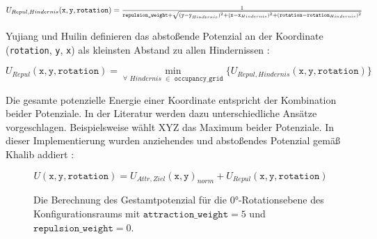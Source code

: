 \begin{equation*}
\hspace*{-0.04\linewidth}
\resizebox{1.1\linewidth}{!}{
  $ U_{Repul, Hindernis}(\texttt{x}, \texttt{y}, \texttt{rotation}) = \frac{1}{\texttt{repulsion\_weight} + \sqrt{(\texttt{y} - \texttt{y}_{Hindernis})^2 + (\texttt{x} - \texttt{x}_{Hindernis})^2 + (\texttt{rotation} - \texttt{rotation}_{Hindernis})^2}}
$ 
}
\hspace*{-0.06\linewidth}
\end{equation*}

Yujiang und Huilin definieren das abstoßende Potenzial an der Koordinate (\texttt{rotation}, \texttt{y}, \texttt{x}) als kleinsten Abstand zu allen Hindernissen \cite{yujiang.2017}:

\begin{equation*}
U_{Repul}(\texttt{x}, \texttt{y}, \texttt{rotation}) = \min_{\forall \,\,Hindernis \,\,\in \texttt{ occupancy\_grid}} \{ U_{Repul, Hindernis}(\texttt{x}, \texttt{y}, \texttt{rotation}) \}
\end{equation*}


Die gesamte potenzielle Energie einer Koordinate entspricht der Kombination beider Potenziale.
In der Literatur werden dazu unterschiedliche Ansätze vorgeschlagen. Beispielsweise wählt XYZ das Maximum beider Potenziale. In dieser Implementierung wurden anziehendes und abstoßendes Potenzial gemäß Khalib addiert \cite{khatib.1985}: 

\begin{equation*}
U(\texttt{x}, \texttt{y}, \texttt{rotation}) = U_{Attr, Ziel}(\texttt{x}, \texttt{y})_{norm} + U_{Repul}(\texttt{x}, \texttt{y}, \texttt{rotation})
\end{equation*}

\begin{figure}[h!]
	\centering
	\footnotesize
	\centerline{}
	\caption{Die Berechnung des Gestamtpotenzial für die $0$°-Rotationsebene des Konfigurationsraums mit $\texttt{attraction\_weight}=5$ und $\texttt{repulsion\_weight}=0$.}
\end{figure}



